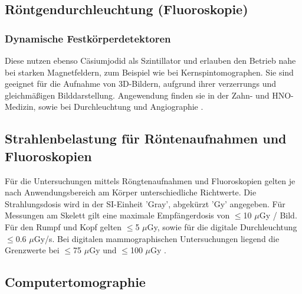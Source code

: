 \subsection{Röntgendurchleuchtung (Fluoroskopie)}
\label{sec:Fluoroskopie}



\subsubsection{Dynamische Festkörperdetektoren}
\label{subsubsec:Festkörperdetektoren}
Diese nutzen ebenso Cäsiumjodid als Szintillator und erlauben den Betrieb nahe bei starken Magnetfeldern, zum Beispiel
wie bei Kernspintomographen. Sie sind geeignet für die Aufnahme von 3D-Bildern, aufgrund ihrer verzerrungs und gleichmäßigen
Bilddarstellung. Angewendung finden sie in der Zahn- und HNO-Medizin, sowie bei Durchleuchtung und Angiographie 
\cite{MedizinischePhysik}.



\subsection{Strahlenbelastung für Röntenaufnahmen und Fluoroskopien}
\label{subsec:Strahlenbelastung}

Für die Untersuchungen mittels Röngtenaufnahmen und Fluoroskopien gelten je nach Anwendungsbereich am Körper unterschiedliche 
Richtwerte. Die Strahlungsdosis wird in der SI-Einheit 'Gray', abgekürzt 'Gy' angegeben. Für Messungen am Skelett gilt eine maximale
Empfängerdosis von $\leq$10 $\mu$Gy / Bild. Für den Rumpf und Kopf gelten $\leq$5 $\mu$Gy, sowie für die digitale Durchleuchtung $\leq$0.6 
 $\mu$Gy/s. Bei digitalen mammographischen Untersuchungen liegend die Grenzwerte bei $\leq$75 $\mu$Gy und $\leq$100 $\mu$Gy \cite{Artikel}.




\subsection{Computertomographie}
\label{sec:CT}





